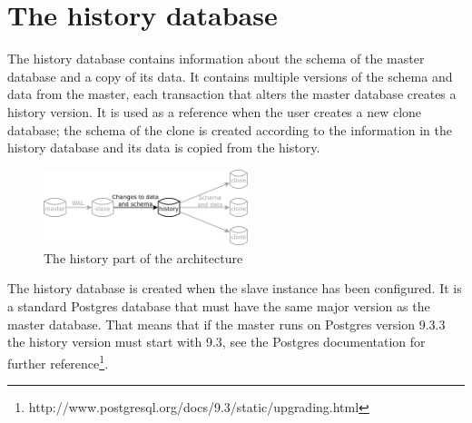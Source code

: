\section{The history database}

The history database contains information about the schema of the master database and a copy of its data.
It contains multiple versions of the schema and data from the master, each transaction that alters the master database creates a history version.
It is used as a reference when the user creates a new clone database; the schema of the clone is created according to the information in the history database and its data is copied from the history.

\begin{figure}
  \vspace{-20pt}
  \begin{center}
    \includegraphics[width=0.53\textwidth]{img/architecture-history}
  \end{center}
  \vspace{-20pt}
  \caption{The history part of the architecture}
  \vspace{-10pt}
\end{figure}

The history database is created when the slave instance has been configured.
It is a standard Postgres database that must have the same major version as the master database.
That means that if the master runs on Postgres version 9.3.3 the history version must start with 9.3, see the Postgres documentation for further reference\footnote{http://www.postgresql.org/docs/9.3/static/upgrading.html}.




